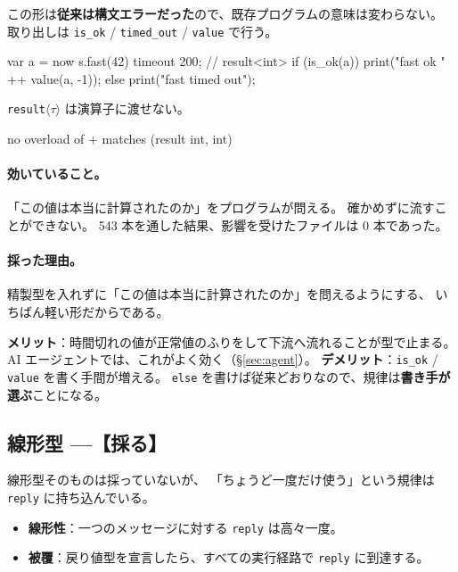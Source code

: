 \documentclass[11pt,a4paper]{ltjsarticle}
\theoremstyle{definition}
\theoremstyle{remark}
\begin{document}
この形は\textbf{従来は構文エラーだった}ので、既存プログラムの意味は変わらない。
取り出しは \texttt{is\_ok} / \texttt{timed\_out} / \texttt{value} で行う。

\begin{aipl}
var a = now s.fast(42) timeout 200;      // result<int>
if (is_ok(a)) { print("fast ok " ++ value(a, -1)); }
else          { print("fast timed out"); }
\end{aipl}

\texttt{result}$\langle\tau\rangle$ は演算子に渡せない。

\begin{term}
 no overload of + matches (result int, int)
\end{term}

\paragraph{効いていること。}
「この値は本当に計算されたのか」をプログラムが問える。
確かめずに流すことができない。
543 本を通した結果、影響を受けたファイルは 0 本であった。

\paragraph{採った理由。}
精製型を入れずに「この値は本当に計算されたのか」を問えるようにする、
いちばん軽い形だからである。

\textbf{メリット}：時間切れの値が正常値のふりをして下流へ流れることが型で止まる。
AI エージェントでは、これがよく効く（\S\ref{sec:agent}）。
\textbf{デメリット}：\texttt{is\_ok} / \texttt{value} を書く手間が増える。
\texttt{else} を書けば従来どおりなので、規律は\textbf{書き手が選ぶ}ことになる。

\subsection{線形型 ---【採る】}


線形型そのものは採っていないが、
「ちょうど一度だけ使う」という規律は \texttt{reply} に持ち込んでいる。

\begin{itemize}
\item \textbf{線形性}：一つのメッセージに対する \texttt{reply} は高々一度。
\item \textbf{被覆}：戻り値型を宣言したら、すべての実行経路で \texttt{reply} に到達する。
\end{itemize}
\end{document}
